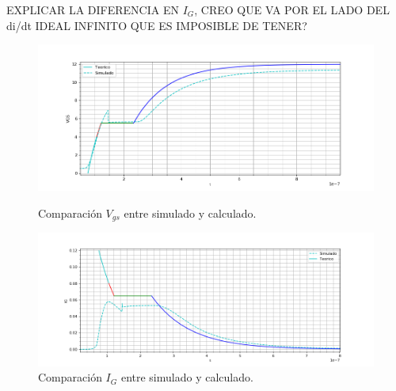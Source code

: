 EXPLICAR LA DIFERENCIA EN $I_G$, CREO QUE VA POR EL LADO DEL di/dt IDEAL INFINITO QUE ES IMPOSIBLE DE TENER?

\begin{figure}[H]
	\centering
	\begin{minipage}{0.5\textwidth}
		\centering
		\includegraphics[width=1.1\textwidth]{ImagenesEjercicio-1/sim_encendido_gate} %
		\caption{Comparación $V_{gs}$ entre simulado y calculado.}
		\label{ej1:fig:sim_encendido_gate}
	\end{minipage}\hfill
	\begin{minipage}{0.5\textwidth}
		\centering
		\includegraphics[width=1.1\textwidth]{ImagenesEjercicio-1/sim_encendido_gate_i} %
		\caption{Comparación $I_{G}$ entre simulado y calculado.}
		\label{ej1:fig:sim_encendido_gate_i}
	\end{minipage}
\end{figure}

